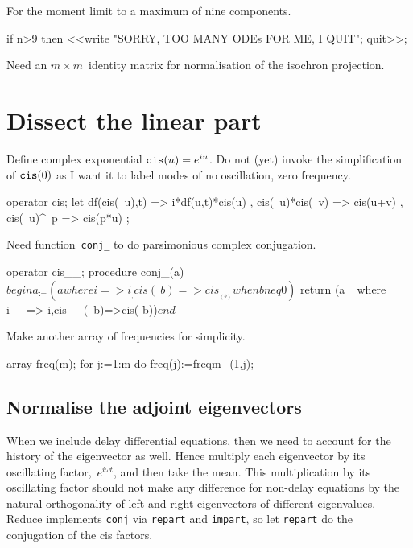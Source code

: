 \documentclass[11pt,a5paper]{article}
\begin{document}
For the moment limit to a maximum of nine components.
\begin{reduce}
if n>9 then <<write "SORRY, TOO MANY ODEs FOR ME, I QUIT"; 
    quit>>;
\end{reduce}

Need an \(m\times m\)~identity matrix for normalisation of the isochron projection.


\section{Dissect the linear part}

Define complex exponential $\verb|cis|(u)=e^{iu}$.
Do not (yet) invoke the simplification of $\verb|cis|(0)$ as I want it to label modes of no oscillation, zero frequency.

\begin{reduce}
operator cis;
let { df(cis(~u),t) => i*df(u,t)*cis(u)
    , cis(~u)*cis(~v) => cis(u+v)
    , cis(~u)^~p => cis(p*u)
    };
\end{reduce}

Need function~\verb|conj_| to do parsimonious complex conjugation.
\begin{reduce}
operator cis__;
procedure conj_(a)$    
    begin a_:=(a where {i=>i__, cis(~b)=>cis__(b) when b neq 0})$
        return (a_ where {i__=>-i,cis__(~b)=>cis(-b)})$
    end$
\end{reduce}

Make another array of frequencies for simplicity.

\begin{reduce}
array freq(m);
for j:=1:m do freq(j):=freqm_(1,j);
\end{reduce}



\subsection{Normalise the adjoint eigenvectors}
When we include delay differential equations, then we need to account for the history of the eigenvector as well.
Hence multiply each eigenvector by its oscillating factor,~\(e^{i\omega t}\), and then take the mean.
This multiplication by its oscillating factor should not make any difference for non-delay equations by the natural orthogonality of left and right eigenvectors of different eigenvalues.
Reduce implements \verb|conj| via \verb|repart| and \verb|impart|, so let \verb|repart| do the conjugation of the cis factors.
\end{document}
